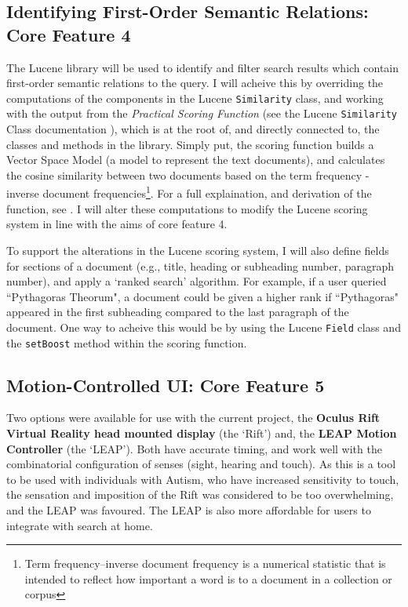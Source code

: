 \documentclass[a4paper, 11pt]{article}
\begin{document}
\begin{justify}
\subsection{Identifying First-Order Semantic Relations: Core Feature 4}\label{apache}
The Lucene library will be used to identify and filter search results which contain first-order semantic relations to the query. I will acheive this by overriding the computations of the components in the Lucene \texttt{Similarity} class, and working with the output from the \textit{Practical Scoring Function} (see the Lucene \texttt{Similarity} Class documentation \cite{similarity}), which is at the root of, and directly connected to, the classes and methods in the library. Simply put, the scoring function builds a Vector Space Model (a model to represent the text documents), and calculates the cosine similarity between two documents based on the term frequency - inverse document frequencies\footnote{Term frequency–inverse document frequency is a numerical statistic that is intended to reflect how important a word is to a document in a collection or corpus}. For a full explaination, and derivation of the function, see \cite{similarity}. I will alter these computations to modify the Lucene scoring system in line with the aims of core feature 4. 

To support the alterations in the Lucene scoring system, I will also define fields for sections of a document (e.g., title, heading or subheading number, paragraph number), and apply a `ranked search' algorithm. For example, if a user queried ``Pythagoras Theorum", a document could be given a higher rank if ``Pythagoras" appeared in the first subheading compared to the last paragraph of the document. One way to acheive this would be by using the Lucene \texttt{Field} class and the \texttt{setBoost} method within the scoring function. 

\subsection{Motion-Controlled UI: Core Feature 5}\label{hardware}
Two options were available for use with the current project, the \textbf{Oculus Rift Virtual Reality head mounted display} (the `Rift') and, the \textbf{LEAP Motion Controller} (the `LEAP'). Both have accurate timing, and work well with the combinatorial configuration of senses (sight, hearing and touch). As this is a tool to be used with individuals with Autism, who have increased sensitivity to touch, the sensation and imposition of the Rift was considered to be too overwhelming, and the LEAP was favoured. The LEAP is also more affordable for users to integrate with search at home. 


\end{justify}
\end{document}

